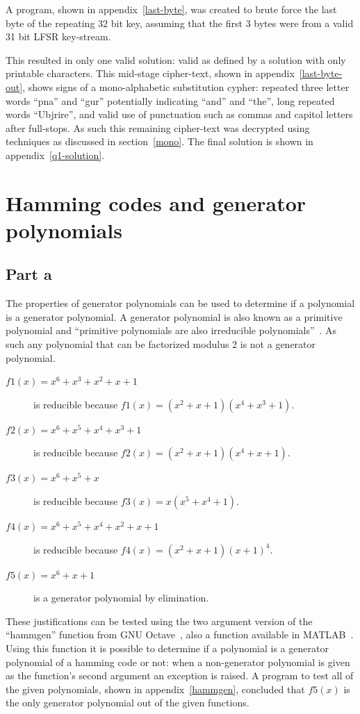 \documentclass[pdftex, 12pt, a4paper]{article}
\begin{document}
A program, shown in appendix~\ref{last-byte}, was created to brute force the
last byte of the repeating 32 bit key, assuming that the first 3 bytes were from
a valid 31 bit LFSR key-stream.

This resulted in only one valid solution: valid as defined by a solution with
only printable characters.  This mid-stage cipher-text, shown in
appendix~\ref{last-byte-out}, shows signs of a mono-alphabetic substitution
cypher: repeated three letter words ``pna'' and ``gur'' potentially indicating
``and'' and ``the'', long repeated words ``Ubjrire'', and valid use of
punctuation such as commas and capitol letters after full-stops. As such this
remaining cipher-text was decrypted using techniques as discussed in
section~\ref{mono}.  The final solution is shown in appendix~\ref{q1-solution}.

\section{Hamming codes and generator polynomials}
\subsection{Part a}
The properties of generator polynomials can be used to determine if a polynomial
is a generator polynomial.  A generator polynomial is also known as a primitive
polynomial and ``primitive polynomials are also irreducible
polynomials''~\cite{wolfram-primative}.  As such any polynomial that can be
factorized modulus 2 is not a generator polynomial.

\begin{description}
    \item[$f1(x) = x^6 + x^3 + x^2 + x + 1$] is reducible because $f1(x) = (x^2+x+1)(x^4+x^3+1)$.
    \item[$f2(x) = x^6 + x^5 + x^4 + x^3 + 1$] is reducible because $f2(x) = (x^2+x+1)(x^4+x+1)$.
    \item[$f3(x) = x^6 + x^5 + x$] is reducible because $f3(x) = x(x^5 + x^4 + 1)$.
    \item[$f4(x) = x^6 + x^5 +x^4 + x^2 +x + 1$] is reducible because $f4(x) = (x^2+x+1)(x+1)^4$.
    \item[$f5(x) = x^6 + x + 1$] is a generator polynomial by elimination.
\end{description}

These justifications can be tested using the two argument version of the
``hammgen'' function from GNU Octave~\cite{hammgen-octave}, also a function
available in MATLAB~\cite{hammgen-matlab}. Using this function it is possible to
determine if a polynomial is a generator polynomial of a hamming code or not:
when a non-generator polynomial is given as the function's second argument an
exception is raised.  A program to test all of the given polynomials, shown in
appendix~\ref{hammgen}, concluded that $f5(x)$ is the only generator polynomial
out of the given functions.
\end{document}

